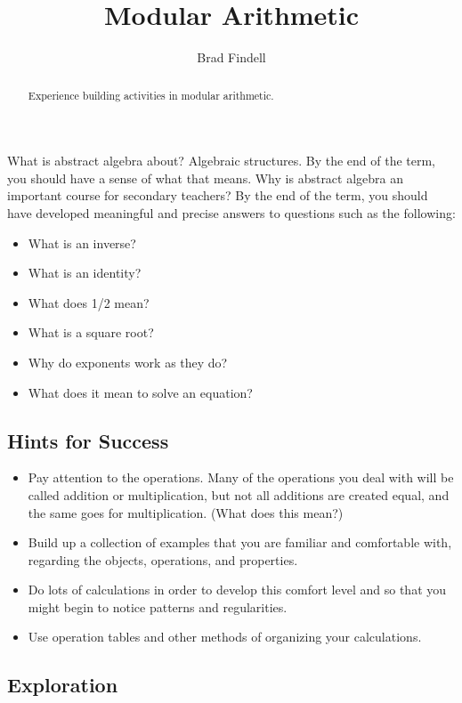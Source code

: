 \documentclass[space,nooutcomes]{ximera}
\title{Modular Arithmetic}
\author{Brad Findell}
\begin{document}
\begin{abstract}
Experience building activities in modular arithmetic.  
\end{abstract}
\maketitle

What is abstract algebra about?  Algebraic structures.  By the end of the term, you should have a sense of what that means.  Why is abstract algebra an important course for secondary teachers?  By the end of the term, you should have developed meaningful and precise answers to questions such as the following: 

\begin{itemize}
\item What is an inverse? 
\item What is an identity?
\item What does 1/2 mean?
\item What is a square root?
\item Why do exponents work as they do?
\item What does it mean to solve an equation?
\end{itemize}

\subsection*{Hints for Success}
\begin{itemize}
\item Pay attention to the operations.  Many of the operations you deal with will be called addition or multiplication, but not all additions are created equal, and the same goes for multiplication.  (What does this mean?)
\item Build up a collection of examples that you are familiar and comfortable with, regarding the objects, operations, and properties.  
\item Do lots of calculations in order to develop this comfort level and so that you might begin to notice patterns and regularities. 
\item Use operation tables and other methods of organizing your calculations.
\end{itemize}


\subsection*{Exploration}
\end{document}
